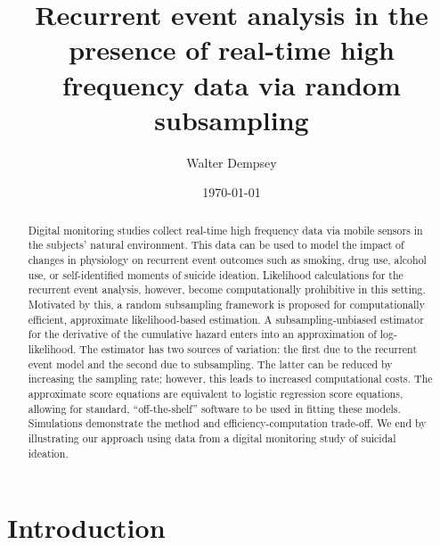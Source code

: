 \documentclass[12pt]{amsart}
\begin{document}
\title[Recurrent event analysis with functional covariates via random subsampling]{Recurrent event analysis in the presence of real-time high frequency data via random subsampling}
\author{Walter Dempsey}
\address {Department of Biostatistics, University of Michigan, 1415 Washington Heights, Ann Arbor, MI 48109, USA}

\date{\today}

\begin{abstract}
Digital monitoring studies collect real-time high frequency data via mobile sensors in the subjects' natural environment. This data can be used to model the impact of changes in physiology on recurrent event outcomes such as smoking, drug use, alcohol use, or self-identified moments of suicide ideation. Likelihood calculations for the recurrent event analysis, however, become computationally prohibitive in this setting. Motivated by this, a random subsampling framework is proposed for computationally efficient, approximate likelihood-based estimation. A subsampling-unbiased estimator for the derivative of the cumulative hazard enters into an approximation of log-likelihood. The estimator has two sources of variation: the first due to the recurrent event model and the second due to subsampling. The latter can be reduced by increasing the sampling rate; however, this leads to increased computational costs.  The approximate score equations are equivalent to logistic regression score equations, allowing for standard, ``off-the-shelf'' software to be used in fitting these models. Simulations demonstrate the method and efficiency-computation trade-off. We end by illustrating our approach using data from a digital monitoring study of suicidal ideation.
\end{abstract}


\maketitle

\section{Introduction}
\end{document}
